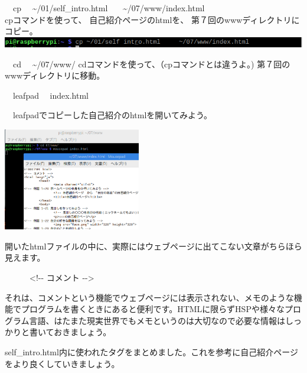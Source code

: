\documentclass[a4paper,12pt,dvipdfmx]{jarticle}
\begin{document}
\begin{minipage}[b]{0.5\textwidth}
	\begin{enumerate}


		\begin{minipage}[b]{1.5\textwidth}
			\item \ \ cp \ \ \~{}/01/self\_intro.html \ \ \ \~{}/07/www/index.html\\
			cpコマンドを使って、 自己紹介ページのhtmlを、 第７回のwwwディレクトリにコピー。\\
			\includegraphics[width=14.73cm]{ome7-img033.png}
		\end{minipage}

		\bigskip

		\item
		      \ \ cd \ \ \~{}/07/www/\newline
		      cdコマンドを使って、（cpコマンドとは違うよ。) 第７回のwwwディレクトリに移動。


		\item \ \ leafpad \ \ index.html

		      \ \ leafpadでコピーした自己紹介のhtmlを開いてみよう。

	\end{enumerate}
\end{minipage}
\includegraphics[width=0.45\textwidth]{ome7-img034.png}

\bigskip

開いたhtmlファイルの中に、実際にはウェブページに出てこない文章がちらほら見えます。

\ \ \ \ \ \ {\textless}!-{}- コメント -{}-{\textgreater}

それは、コメントという機能でウェブページには表示されない、メモのような機能でプログラムを書くときにあると便利です。HTMLに限らずHSPや様々なプログラム言語、はたまた現実世界でもメモというのは大切なので必要な情報はしっかりと書いておきましょう。

self\_intro.html内に使われたタグをまとめました。これを参考に自己紹介ページをより良くしていきましょう。
\end{document}
